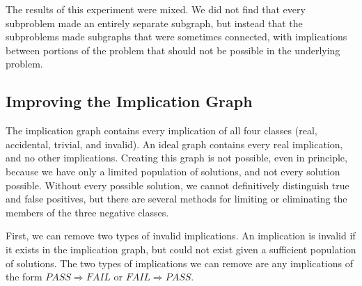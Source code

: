 \documentclass[11pt,twoside]{article}
\newcommand\fail{\mathit{FAIL}}
\newcommand\pass{\mathit{PASS}}
\theoremstyle{definition}
\begin{document}

The results of this experiment were mixed. We did not find that every subproblem made an entirely separate subgraph, but instead that the subproblems made subgraphs that were sometimes connected, with implications between portions of the problem that should not be possible in the underlying problem.

\subsection{Improving the Implication Graph}

The implication graph contains every implication of all four classes (real, accidental, trivial, and invalid). An ideal graph contains every real implication, and no other implications. Creating this graph is not possible, even in principle, because we have only a limited population of solutions, and not every solution possible. Without every possible solution, we cannot definitively distinguish true and false positives, but there are several methods for limiting or eliminating the members of the three negative classes.

First, we can remove two types of invalid implications. An implication is invalid if it exists in the implication graph, but could not exist given a sufficient population of solutions. The two types of implications we can remove are any implications of the form $\pass\Rightarrow\fail$ or $\fail\Rightarrow\pass$.
\end{document}
